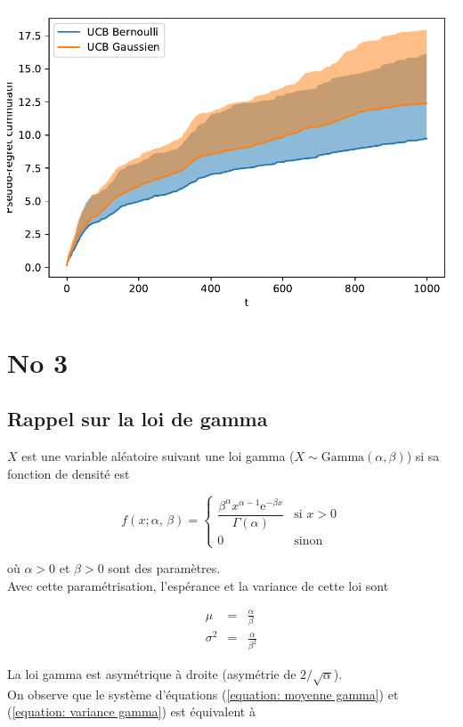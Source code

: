 \documentclass[letterpaper,11pt]{article}
\renewcommand{\exp}[1]{\mathrm{e}^{#1}}
\begin{document}
\includegraphics[scale=0.4]{figures/comparaison.pdf}
\label{fig: kl_ucb}

\section{No 3}

\subsection{Rappel sur la loi de gamma}

$X$ est une variable aléatoire suivant une loi gamma ($X\sim\mathrm{Gamma}(\alpha,\beta)$) si sa fonction de densité est

\begin{equation}
f(x; \alpha,\,\beta) =  
\left\{
\begin{array}{cl}
\dfrac{\beta^{\alpha} x^{\alpha-1} \exp{-\beta x}}{\Gamma(\alpha)} & \text{si } x>0\\[0.4cm]
0 & \text{sinon}
\end{array}
\right.
\end{equation}

où $\alpha>0$ et $\beta>0$ sont des paramètres. \\
Avec cette paramétrisation, l'espérance et la variance de cette loi sont

\begin{eqnarray} 
\mu      &=& \frac{\alpha}{\beta} \label{equation: moyenne gamma}\\
\sigma^2 &=& \frac{\alpha}{\beta^2} \label{equation: variance gamma}
\end{eqnarray}

La loi gamma est asymétrique à droite (asymétrie de $2/\sqrt{\alpha}$).\\
On observe que le système d'équations (\ref{equation: moyenne gamma}) et (\ref{equation: variance gamma}) est équivalent à
\end{document}
